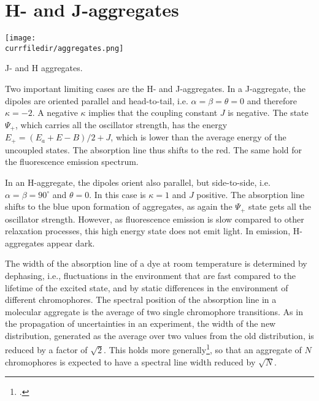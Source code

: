 \section{H- and J-aggregates}

\begin{marginfigure}
\texttt{[image: \\currfiledir/aggregates.png]}
\caption{J- and H aggregates.}
\end{marginfigure}

Two important limiting cases are the H- and J-aggregates. In a J-aggregate, the dipoles are oriented parallel and head-to-tail, i.e. $\alpha = \beta = \theta = 0$ and therefore $\kappa = -2$. A negative $\kappa$ implies that the coupling constant $J$ is negative. The state $\Psi_+$, which carries all the oscillator strength, has the energy $E_+ = (E_a + E-B) / 2 + J$, which is lower than the average energy of the uncoupled states. The absorption line thus shifts to the red. The same hold for the fluorescence emission spectrum.

In an H-aggregate, the dipoles orient also parallel, but side-to-side, i.e.  $\alpha = \beta = 90^\circ$ and $\theta = 0$. In this case is $\kappa =1$ and $J$ positive. The absorption line shifts to the blue upon formation of aggregates, as again the  $\Psi_+$ state gets all the oscillator strength. However, as fluorescence emission is slow compared to other relaxation processes, this high energy state does not emit light. In emission, H-aggregates appear dark.

The width of the absorption line of a dye at room temperature is determined by dephasing, i.e., fluctuations in the environment that are fast compared to the lifetime of the excited state, and by static differences in the environment of different chromophores. The spectral position of the absorption line in a molecular aggregate is the average of two single chromophore transitions. As in the propagation of uncertainties in an experiment, the width of the new distribution, generated as the average over two values from the old distribution, is reduced by a factor of $\sqrt{2}$. This holds more generally\footcite{Knapp1984}, so that an aggregate of $N$ chromophores is expected to have a spectral line width reduced by $\sqrt{N}$.








\printbibliography[segment=\therefsegment,heading=subbibliography]
